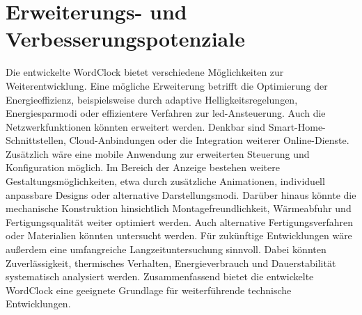 \section{Erweiterungs- und Verbesserungspotenziale}
Die entwickelte WordClock bietet verschiedene Möglichkeiten zur Weiterentwicklung.  
Eine mögliche Erweiterung betrifft die Optimierung der Energieeffizienz, beispielsweise durch adaptive Helligkeitsregelungen, Energiesparmodi oder effizientere Verfahren zur \gls{led}-Ansteuerung.  
Auch die Netzwerkfunktionen könnten erweitert werden.  
Denkbar sind Smart-Home-Schnittstellen, Cloud-Anbindungen oder die Integration weiterer Online-Dienste.  
Zusätzlich wäre eine mobile Anwendung zur erweiterten Steuerung und Konfiguration möglich.  
Im Bereich der Anzeige bestehen weitere Gestaltungsmöglichkeiten, etwa durch zusätzliche Animationen, individuell anpassbare Designs oder alternative Darstellungsmodi.  
Darüber hinaus könnte die mechanische Konstruktion hinsichtlich Montagefreundlichkeit, Wärmeabfuhr und Fertigungsqualität weiter optimiert werden.  
Auch alternative Fertigungsverfahren oder Materialien könnten untersucht werden.  
Für zukünftige Entwicklungen wäre außerdem eine umfangreiche Langzeituntersuchung sinnvoll.  
Dabei könnten Zuverlässigkeit, thermisches Verhalten, Energieverbrauch und Dauerstabilität systematisch analysiert werden.  
Zusammenfassend bietet die entwickelte WordClock eine geeignete Grundlage für weiterführende technische Entwicklungen.